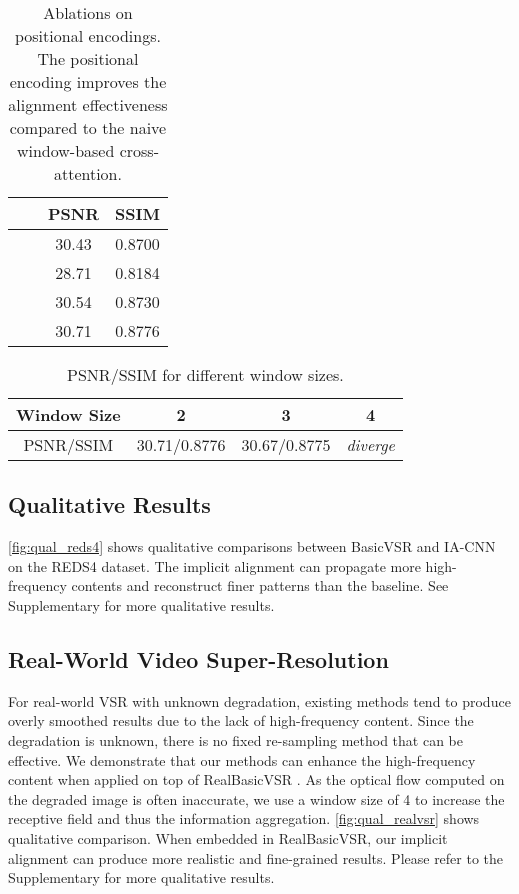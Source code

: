 \documentclass[10pt,twocolumn,letterpaper]{article}
\newcommand{\cmark}{\ding{51}}\newcommand{\xmark}{\ding{55}}
\begin{document}
\begin{table}[h]
\centering
\small
\begin{tabular}{c|c|c|c}
\toprule
      &     & PSNR & SSIM   \\
\midrule
\xmark      & \xmark    & 30.43 & 0.8700   \\
\cmark      & \xmark    & 28.71 & 0.8184   \\
\xmark      & \cmark    & 30.54 & 0.8730   \\
\cmark      & \cmark    & 30.71 & 0.8776   \\
\bottomrule
\end{tabular}
\caption{Ablations on positional encodings. The positional encoding improves the alignment effectiveness compared to the naive window-based cross-attention.}\label{tab:pe}
\end{table}

\begin{table}[h]
\centering
\small
\begin{tabular}{c|c|c|c}
\toprule
Window Size & 2 &3 &4   \\
\midrule
PSNR/SSIM           & 30.71/0.8776  &30.67/0.8775   &  \textit{diverge}      \\
\bottomrule
\end{tabular}
\caption{PSNR/SSIM for different window sizes.}\label{tab:window_size}
\vspace{-.5cm}

\end{table}

\subsection{Qualitative Results}
\cref{fig:qual_reds4} shows qualitative comparisons between BasicVSR and IA-CNN on the REDS4 dataset. The implicit alignment can propagate more high-frequency contents and reconstruct finer patterns than the baseline. See Supplementary for more qualitative results.
\subsection{Real-World Video Super-Resolution}

For real-world VSR with unknown degradation, existing methods tend to produce overly smoothed results due to the lack of high-frequency content. Since the degradation is unknown, there is no fixed re-sampling method that can be effective. We demonstrate that our methods can enhance the high-frequency content when applied on top of RealBasicVSR \cite{chan2022investigating}. As the optical flow computed on the degraded image is often inaccurate, we use a window size of 4 to increase the receptive field and thus the information aggregation. \cref{fig:qual_realvsr} shows qualitative comparison. When embedded in RealBasicVSR, our implicit alignment can produce more realistic and fine-grained results. Please refer to the Supplementary for more qualitative results.
\end{document}
